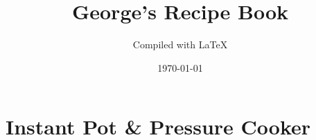 \documentclass[13pt,a4paper]{book}
\begin{document}
\dominitoc %

\title{George’s Recipe Book}
\author{Compiled with \LaTeX}
\date{\today}
\maketitle

\tableofcontents


\chapter{Instant Pot \& Pressure Cooker}
\minitoc
\newpage

\newpage

\newpage

\newpage

\newpage

\newpage

\newpage

\newpage

\newpage

\newpage

\newpage

\newpage

\newpage

\newpage

\newpage

\newpage

\newpage

\newpage

\newpage

\newpage

\newpage

\newpage

\newpage

\newpage

\newpage

\newpage

\newpage

\newpage

\newpage

\newpage

\end{document}
